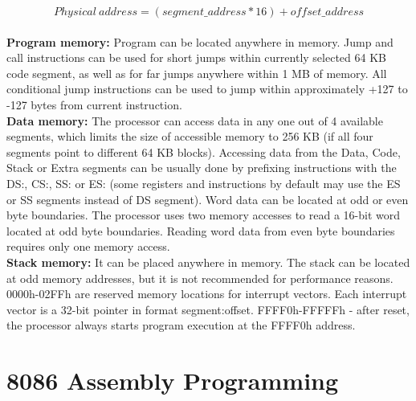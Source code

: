 \documentclass[12pt, a4paper]{scrartcl}
\begin{document}
	$$ Physical\ address = (segment\_address * 16) + offset\_address $$\\

	\textbf{Program memory: }Program can be located anywhere in memory. Jump and call instructions can be used for short
	jumps within currently selected 64 KB code segment, as
	well as for far jumps anywhere within 1 MB of memory. All conditional jump instructions can be used to jump
	within approximately +127 to -127 bytes from current
	instruction. \\

	\textbf{Data memory: }The processor can access data in any one
	out of 4 available segments, which limits the size of
	accessible memory to 256 KB (if all four segments point to
	different 64 KB blocks). Accessing data from the Data, Code, Stack or Extra segments can be usually done by prefixing instructions
	with the DS:, CS:, SS: or ES: (some registers and instructions by default may use the ES or SS segments instead of DS segment). Word data can be located at odd or even byte boundaries.	The processor uses two memory accesses to read a 16-bit	word located at odd byte boundaries. Reading word data from even byte boundaries requires only one memory	access. \\

	\textbf{Stack memory: }It can be placed anywhere in memory. The
	stack can be located at odd memory addresses, but it is not
	recommended for performance reasons. \\

	0000h-02FFh are reserved memory locations for interrupt vectors. Each interrupt vector is a 32-bit pointer in format segment:offset. FFFF0h-FFFFFh - after reset, the processor always starts program execution at the FFFF0h address.


\section{8086 Assembly Programming}
\end{document}
